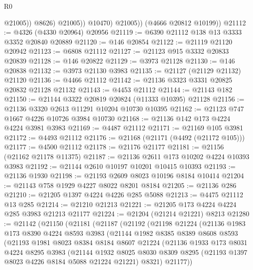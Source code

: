 \begin{lexlean}{R0}
\begin{coremodule}
                      @21005))
                  @8626)
                @21005))
            @10470)
          @21005))
      (@4666 @20812 @10199))
@21112 := @4326 (@4330 @20964) @20956
@21119 := @6390 @21112 @138 @13 @3333 @3352 @20840 @20889
@21120 := @146 @20854
@21122 := @21119 @21120 @20942
@21123 := @6808 @21112
@21127 := @21123 @915 @3332 @20833 @20839
@21128 := @146 @20822
@21129 := @3973 @21128
@21130 := @146 @20838
@21132 := @3973 @21130 @3983
@21135 := @21127 (@21129 @21132) @21120
@21136 := @4466 @21112
@21142 := @21136 @3323 @3331 @20825 @20832 @21128 @21132
@21143 := @4453 @21112
@21144 := @21143 @182
@21150 := @21144 @3322 @20819 @20824 (@11333 @10395) @21128
@21156 := @21136 @3320 @2613 @11291 @10204 @10730 @10395
@21162 := @21123 @747 @1667 @4226 @10726 @3984 @10730
@21168 := @21136 @142 @173 @4224 @4224 @3981 @3983
@21169 := @4487 @21112
@21171 := @21169 @105 @3981
@21172 := @4493 @21112
@21176 := @21168 (@21171 (@4492 (@21172 @105)))
@21177 := @4500 @21112
@21178 := @21176 @21177
@21181 := @21156 (@21162 @21178 @11375)
@21187 := @21136 @2611 @173 @10202 @4224 @10393 @3983
@21192 := @21144 @2610 @10197 @10201 @10415 @10393
@21193 := @21136 @1930
@21198 := @21193 @2609 @8023 @10196 @8184 @10414
@21204 := @21143 @758 @1929 @4227 @8022 @8201 @8184
@21205 := @21136 @286
@21210 := @21205 @1397 @4224 @4226 @285 @5088
@21213 := @4475 @21112 @13 @285
@21214 := @21210 @21213
@21221 := @21205 @173 @4224 @4224 @285 @3983 @21213 @21177
@21224 := @21204 (@21214 @21221) @8213
@21280 := @21142
    (@21150
      (@21181
        (@21187
          (@21192
            (@21198
              @21224
              (@21136
                @1983
                @173
                @8390
                @4224
                @8593
                @3983
                (@21144
                  @1982
                  @8385
                  @8389
                  @8608
                  @8593
                  (@21193
                    @1981
                    @8023
                    @8384
                    @8184
                    @8607
                    @21224
                    (@21136
                      @1933
                      @173
                      @8031
                      @4224
                      @8295
                      @3983
                      (@21144
                        @1932
                        @8025
                        @8030
                        @8309
                        @8295
                        (@21193 @1397 @8023 @4226 @8184 @5088 @21224 @21221)
                        @8321)
                      @21177))

\end{coremodule}
\end{lexlean}
